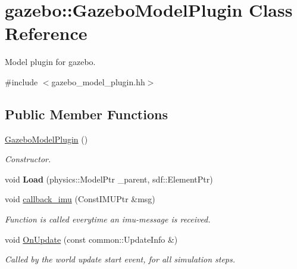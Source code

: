 \hypertarget{classgazebo_1_1GazeboModelPlugin}{\section{gazebo\-:\-:\-Gazebo\-Model\-Plugin \-Class \-Reference}
\label{classgazebo_1_1GazeboModelPlugin}
}


\-Model plugin for gazebo.  




{\ttfamily \#include $<$gazebo\-\_\-model\-\_\-plugin.\-hh$>$}

\subsection*{\-Public \-Member \-Functions}
\begin{DoxyCompactItemize}
\item 
\hypertarget{classgazebo_1_1GazeboModelPlugin_a2eb3a7d7cac16ab46a6be036a9573b12}{\hyperlink{classgazebo_1_1GazeboModelPlugin_a2eb3a7d7cac16ab46a6be036a9573b12}{\-Gazebo\-Model\-Plugin} ()}\label{classgazebo_1_1GazeboModelPlugin_a2eb3a7d7cac16ab46a6be036a9573b12}

\begin{DoxyCompactList}\small\item\em \-Constructor. \end{DoxyCompactList}\item 
\hypertarget{classgazebo_1_1GazeboModelPlugin_a1bf10d7f63327b8d024686443a114483}{void {\bfseries \-Load} (physics\-::\-Model\-Ptr \-\_\-parent, sdf\-::\-Element\-Ptr)}\label{classgazebo_1_1GazeboModelPlugin_a1bf10d7f63327b8d024686443a114483}

\item 
\hypertarget{classgazebo_1_1GazeboModelPlugin_a65181b67c9709f1f66767b540bf632ce}{void \hyperlink{classgazebo_1_1GazeboModelPlugin_a65181b67c9709f1f66767b540bf632ce}{callback\-\_\-imu} (\-Const\-I\-M\-U\-Ptr \&msg)}\label{classgazebo_1_1GazeboModelPlugin_a65181b67c9709f1f66767b540bf632ce}

\begin{DoxyCompactList}\small\item\em \-Function is called everytime an imu-\/message is received. \end{DoxyCompactList}\item 
\hypertarget{classgazebo_1_1GazeboModelPlugin_aab07b045bb13a56523a8843954d6f78c}{void \hyperlink{classgazebo_1_1GazeboModelPlugin_aab07b045bb13a56523a8843954d6f78c}{\-On\-Update} (const common\-::\-Update\-Info \&)}\label{classgazebo_1_1GazeboModelPlugin_aab07b045bb13a56523a8843954d6f78c}

\begin{DoxyCompactList}\small\item\em \-Called by the world update start event, for all simulation steps. \end{DoxyCompactList}\end{DoxyCompactItemize}
